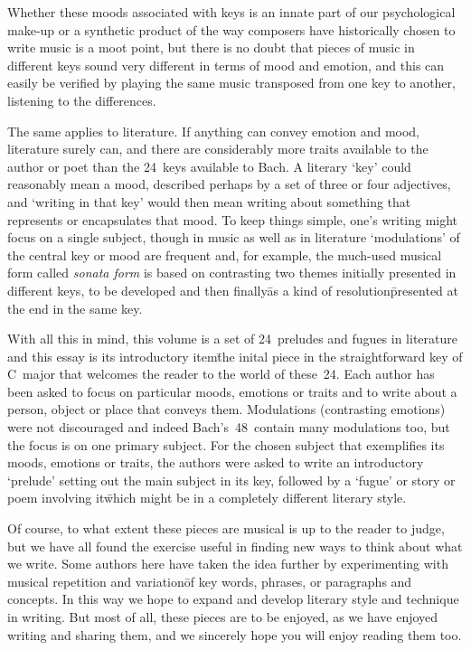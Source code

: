 Whether these moods associated with keys is an innate part of our
psychological make-up or a synthetic product of the way composers have
historically chosen to write music is a moot point, but there is no
doubt that pieces of music in different keys sound very different in
terms of mood and emotion, and this can easily be verified by playing
the same music transposed from one key to another, listening to the
differences.

The same applies to literature.  If anything can convey emotion and
mood, literature surely can, and there are considerably more traits
available to the author or poet than the 24~keys available to Bach.  A
literary `key' could reasonably mean a mood, described perhaps by a
set of three or four adjectives, and `writing in that key' would then
mean writing about something that represents or encapsulates that
mood.  To keep things simple, one's writing might focus on a single
subject, though in music as well as in literature `modulations' of the
central key or mood are frequent and, for example, the much-used
musical form called \textit{sonata form} is based on contrasting two
themes initially presented in different keys, to be developed and then
finally\=as a kind of resolution\=presented at the end in the same key.

With all this in mind, this volume is a set of 24~preludes and
fugues in literature and this essay is its introductory item\=the
inital piece in the straightforward key of C~major
that welcomes the reader to the world of these~24. Each author
has been asked to focus on particular moods, emotions or traits and to
write about a person, object or place that conveys them.  Modulations
(contrasting emotions) were not discouraged and indeed Bach's~48~contain
many modulations too, but the focus is on one primary
subject.  For the chosen subject that exemplifies its moods, emotions or traits,
the authors were asked to write an
introductory `prelude' setting out the main subject in its key,
followed by a `fugue' or story or poem involving it\=which might be in
a completely different literary style.

Of course, to what extent these pieces are musical is up to the reader
to judge, but we have all found the exercise useful in finding new
ways to think about what we write.
Some authors here have taken the
idea further by experimenting with musical repetition and variation\=of key
words, phrases,  or paragraphs and concepts.
In this way we hope to expand and develop
literary style and technique in writing.  But most of all,
these pieces are to be enjoyed, as we have enjoyed writing and sharing them, and we sincerely hope you will
enjoy reading them too.

